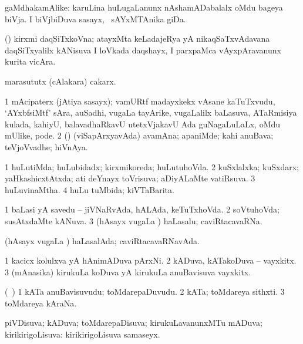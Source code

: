 \bentry
{} 
\gl{\nA}
\expl{}
\bmng
gaMdhakamAlike: 
\banum
{} karuLina huLugaLanunx nAshamADabalalx oMdu bageya biVja. 
 I biVjbiDuva sasayx, \kanmu\ sAYxMTAnika giDa. 
\eanum
\emng
\eentry

\bentry
{} 
\gl{\nA}
\expl{}
\bmng
(\hA) kirxmi daqSiTxkoVna; atayxMta keLadajeRya yA nikaqSaTxvAdavana daqSiTxyalilx kANisuva I loVkada daqshayx, I parxpaMca vAyxpAravanunx kurita vicAra. 
\emng
\eentry

\bentry
{} 
\gl{\nA}
\expl{}
\bmng
marasututx (cAlakara) cakarx. 
\emng
\eentry

\bentry
{} 
\gl{\nA}
\expl{}
\bmng
\bnum
\num{1} mAcipaterx (jAtiya sasayx); vamURtf madayxkekx vAsane kaTuTxvudu, `AYxbfsiMtf' sAra, auSadhi, \mo vugaLa tayArike, \mo vugaLalilx baLasuva, ATaRmisiya kulada, kahiyU, balavadhaRkavU utetxVjakavU Ada guNagaLuLaLx, oMdu mUlike, pode. 
\num{2} (\rUpa) (viSapArxyavAda) avamAna; apaniMde; kahi anuBava; teVjoVvadhe; hiVnAya. 
\enum
\emng
\eentry

\bentry
{} 
\gl{\gu}
\bmng
\bnum
\num{1} huLutiMda; huLubidadx; kirxmikoreda; huLutuhoVda. 
\num{2} kuSxlalxka; kuSxdarx; yaHkashicxtAtxda; ati deYnayx toVrisuva; aDiyALaMte vatiRsuva. 
\num{3} huLuvinaMtha. 
\num{4} huLu tuMbida; kiVTaBarita. 
\enum
\emng
\eentry

\bentry
{} 
\gl{\gu}
\expl{}
\bmng
\bnum
\num{1} baLasi yA savedu -- jiVNaRvAda, hALAda, keTuTxhoVda. 
\num{2} soVtuhoVda; susAtxdaMte kANuva. 
\num{3} (hAsayx \mo vugaLa \vi) haLasalu; caviRtacavaRNa. 
\enum
\emng

\noindent
\gl{\pagu}
\expl{}
\bmng
{} (hAsayx \mo vugaLa \vi) haLasalAda; caviRtacavaRNavAda. 
\emng
\eentry

\bentry
{} 
\gl{\nA}
\expl{}
\bmng
\bnum
\num{1} kacicx kolulxva yA hAnimADuva pArxNi. 
\num{2} kADuva, kATakoDuva -- vayxkitx. 
\num{3} (mAnasika) kirukuLa koDuva yA kirukuLa anuBavisuva vayxkitx. 
\enum
\emng
\eentry

\bentry
{} 
\gl{\nA}
\expl{}
\bmng
(\kanmu\ \ame) 
\bnum
\num{1} kATa anuBavisuvudu; toMdarepaDuvudu. 
\num{2} kATa; toMdareya sithxti. 
\num{3} toMdareya kAraNa. 
\enum
\emng
\eentry

\bentry
{} 
\gl{\gu}
\expl{}
\bmng
piVDisuva; kADuva; toMdarepaDisuva; kirukuLavanunxMTu mADuva; kirikirigoLisuva:  kirikirigoLisuva samaseyx. 
\emng
\eentry

